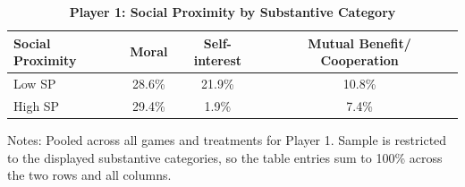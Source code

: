 \begin{table}[!htbp]
\centering
\caption{\textbf{Player 1: Social Proximity by Substantive Category}}
\label{tab:player1_sp_by_category}
\begin{tabular}{lccc}
\toprule
Social Proximity & Moral & Self-interest & Mutual Benefit/ Cooperation \\
\midrule
Low SP & 28.6\% & 21.9\% & 10.8\% \\
High SP & 29.4\% & 1.9\% & 7.4\% \\
\bottomrule
\end{tabular}
\begin{flushleft}
\footnotesize Notes: Pooled across all games and treatments for Player 1. Sample is restricted to the displayed substantive categories, so the table entries sum to 100\% across the two rows and all columns.
\end{flushleft}
\end{table}
